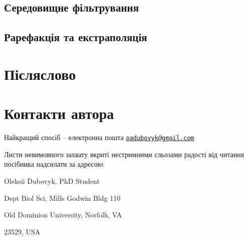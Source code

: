 \documentclass[
  11pt,
]{book}
\begin{document}
\section{Середовищне фільтрування}\label{env-filter}

\section{Рарефакція та екстраполяція}\label{rarefaction}

\chapter*{Післяслово}\label{ux43fux456ux441ux43bux44fux441ux43bux43eux432ux43e}

\chapter*{Контакти автора}\label{ux43aux43eux43dux442ux430ux43aux442ux438-ux430ux432ux442ux43eux440ux430}

Найкращий спосіб -- електронна пошта \href{mailto:oadubovyk@gmail.com}{\nolinkurl{oadubovyk@gmail.com}}

Листи невимовного захвату вкриті нестримними сльозами радості від читання посібника надсилати за адресою:

Oleksii Dubovyk, PhD Student

Dept Biol Sci, Mills Godwin Bldg 110

Old Dominion University, Norfolk, VA

23529, USA

  
\end{document}
